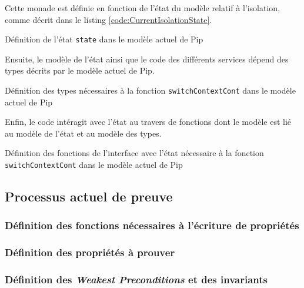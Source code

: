 		Cette monade est définie en fonction de l'état du modèle relatif à l'isolation, comme décrit dans le listing \ref{code:CurrentIsolationState}.
		\begin{listing}[!ht]
			\caption{Définition de l'état \texttt{state} dans le modèle actuel de Pip}
			\label{code:CurrentIsolationState}
		\end{listing}
		
		Ensuite, le modèle de l'état ainsi que le code des différents services dépend des types décrits par le modèle actuel de Pip.

		\begin{listing}[!ht]
			\caption{Définition des types nécessaires à la fonction \texttt{switchContextCont} dans le modèle actuel de Pip}
			\label{code:CurrentTypesModel}
		\end{listing}

		Enfin, le code intéragit avec l'état au travers de fonctions dont le modèle est lié au modèle de l'état et au modèle des types.

		\begin{listing}[!ht]
			\caption{Définition des fonctions de l'interface avec l'état nécessaire à la fonction \texttt{switchContextCont} dans le modèle actuel de Pip}
			\label{code:CurrentFunctionsModel}
		\end{listing}

		\subsection{Processus actuel de preuve}

			\subsubsection{Définition des fonctions nécessaires à l'écriture de propriétés}

			\subsubsection{Définition des propriétés à prouver}

			\subsubsection{Définition des \emph{Weakest Preconditions} et des invariants}

